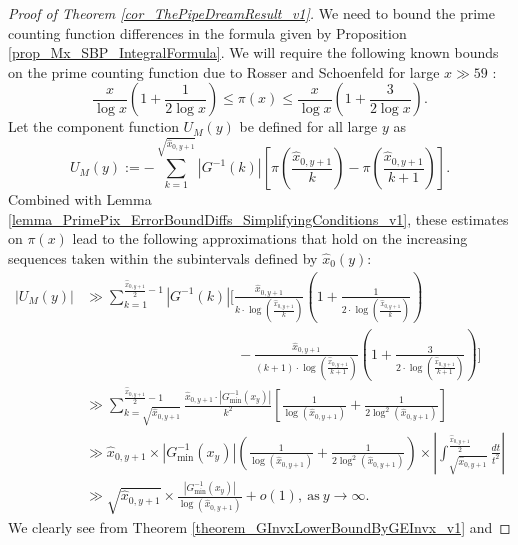 \documentclass[11pt,reqno,a4letter]{article}
\numberwithin{figure}{section}
\numberwithin{table}{section}
\theoremstyle{plain}
\numberwithin{theorem}{section}
\theoremstyle{definition}
\begin{document}
\begin{proof}[Proof of Theorem \ref{cor_ThePipeDreamResult_v1}]
We need to bound the prime counting function differences in the formula given by 
Proposition \ref{prop_Mx_SBP_IntegralFormula}. 
We will require the following known bounds on the prime counting 
function due to Rosser and Schoenfeld for large $x \gg 59$ 
\cite[Thm.\ 1]{ROSSER-SCHOENFELD-1962}: 
\begin{equation} 
\label{eqn_RosserSchoenfeld_PrimePixBounds_v2} 
\frac{x}{\log x}\left(1 + \frac{1}{2\log x}\right) \leq \pi(x) \leq 
     \frac{x}{\log x}\left(1 + \frac{3}{2 \log x}\right). 
\end{equation} 
Let the component function $U_M(y)$ be defined for all large $y$ as 
\[
U_M(y) := -\sum_{k=1}^{\sqrt{\hat{x}_{0,y+1}}} |G^{-1}(k)| \left[ 
     \pi\left(\frac{\hat{x}_{0,y+1}}{k}\right) - 
     \pi\left(\frac{\hat{x}_{0,y+1}}{k+1}\right)
     \right]. 
\]
Combined with Lemma \ref{lemma_PrimePix_ErrorBoundDiffs_SimplifyingConditions_v1}, 
these estimates on $\pi(x)$ lead to the following approximations that hold on the 
increasing sequences taken within the subintervals defined by $\widehat{x}_0(y)$: 
\begin{align*} 
|U_M(y)| & \gg \sum_{k=1}^{\frac{\hat{x}_{0,y+1}}{2}-1} |G^{-1}(k)| \Biggl[ 
     \frac{\hat{x}_{0,y+1}}{k \cdot \log\left(\frac{\hat{x}_{0,y+1}}{k}\right)} \left(1 + 
     \frac{1}{2 \cdot \log\left(\frac{\hat{x}_{0,y+1}}{k}\right)}\right) \\ 
     & \phantom{\gg \sum_{k=1}^{\frac{\hat{x}_{0,y+1}}{2}-1} |G^{-1}(k)| \Biggl[\ } - 
     \frac{\hat{x}_{0,y+1}}{(k+1) \cdot \log\left(\frac{\hat{x}_{0,y+1}}{k+1}\right)} \left(1 + 
     \frac{3}{2 \cdot \log\left(\frac{\hat{x}_{0,y+1}}{k+1}\right)}\right)
     \Biggr] \\ 
     & \gg 
     \sum_{k=\sqrt{\hat{x}_{0,y+1}}}^{\frac{\hat{x}_{0,y+1}}{2}-1} \frac{\hat{x}_{0,y+1} \cdot 
     |G_{\min}^{-1}(x_y)|}{k^2} \left[ 
     \frac{1}{\log(\hat{x}_{0,y+1})} + \frac{1}{2 \log^2(\hat{x}_{0,y+1})}\right] \\ 
     & \gg \hat{x}_{0,y+1} \times |G_{\min}^{-1}(x_y)| \left(\frac{1}{\log(\hat{x}_{0,y+1})} + 
     \frac{1}{2 \log^2(\hat{x}_{0,y+1})}\right) \times 
     \left\lvert \int_{\sqrt{\hat{x}_{0,y+1}}}^{\frac{\hat{x}_{0,y+1}}{2}} 
     \frac{dt}{t^2} \right\rvert \\ 
     & \gg \sqrt{\hat{x}_{0,y+1}} \times 
     \frac{|G_{\min}^{-1}(x_y)|}{\log(\hat{x}_{0,y+1})} 
     + o(1), \mathrm{\ as\ } y \rightarrow \infty. 
\end{align*} 
We clearly see from Theorem \ref{theorem_GInvxLowerBoundByGEInvx_v1} and 

\end{proof}
\end{document}
